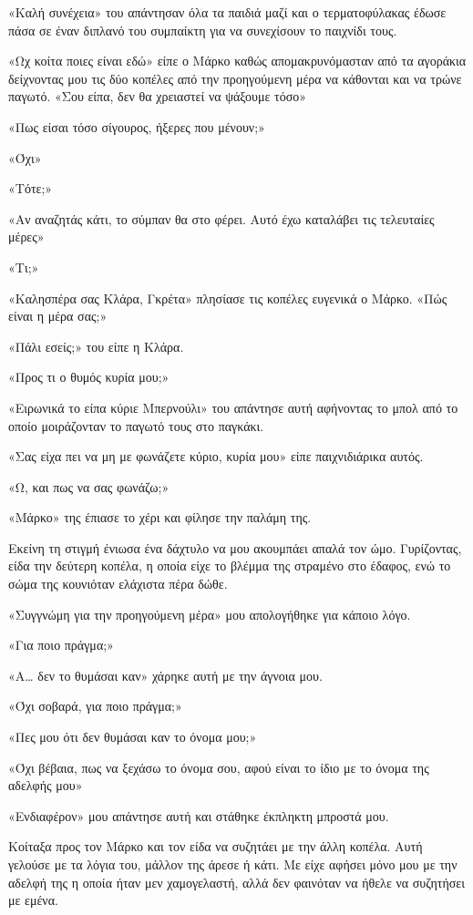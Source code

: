 \documentclass[12pt,twoside, openany]{book}
\begin{document}
«Καλή συνέχεια» του απάντησαν όλα τα παιδιά μαζί και ο τερματοφύλακας έδωσε πάσα σε έναν διπλανό του συμπαίκτη για να συνεχίσουν το παιχνίδι τους.

«Ωχ κοίτα ποιες είναι εδώ» είπε ο Μάρκο καθώς απομακρυνόμασταν από τα αγοράκια δείχνοντας μου τις δύο κοπέλες από την προηγούμενη μέρα να κάθονται και να τρώνε παγωτό. «Σου είπα, δεν θα χρειαστεί να ψάξουμε τόσο»

«Πως είσαι τόσο σίγουρος, ήξερες που μένουν;»

«Όχι»

«Τότε;»

«Αν αναζητάς κάτι, το σύμπαν θα στο φέρει. Αυτό έχω καταλάβει τις τελευταίες μέρες»

«Τι;»

«Καλησπέρα σας Κλάρα, Γκρέτα» πλησίασε τις κοπέλες ευγενικά ο Μάρκο. «Πώς είναι η μέρα σας;»

«Πάλι εσείς;» του είπε η Κλάρα.

«Προς τι ο θυμός κυρία μου;»

«Ειρωνικά το είπα κύριε Μπερνούλι» του απάντησε αυτή αφήνοντας το μπολ από το οποίο μοιράζονταν το παγωτό τους στο παγκάκι.

«Σας είχα πει να μη με φωνάζετε κύριο, κυρία μου» είπε παιχνιδιάρικα αυτός.

«Ω, και πως να σας φωνάζω;»

«Μάρκο» της έπιασε το χέρι και φίλησε την παλάμη της.

Εκείνη τη στιγμή ένιωσα ένα δάχτυλο να μου ακουμπάει απαλά τον ώμο. Γυρίζοντας, είδα την δεύτερη κοπέλα, η οποία είχε το βλέμμα της στραμένο στο έδαφος, ενώ το σώμα της κουνιόταν ελάχιστα πέρα δώθε. 

«Συγγνώμη για την προηγούμενη μέρα» μου απολογήθηκε για κάποιο λόγο.

«Για ποιο πράγμα;»

«Α… δεν το θυμάσαι καν» χάρηκε αυτή με την άγνοια μου.

«Όχι σοβαρά, για ποιο πράγμα;»

«Πες μου ότι δεν θυμάσαι καν το όνομα μου;» 

«Όχι βέβαια, πως να ξεχάσω το όνομα σου, αφού είναι το ίδιο με το όνομα της αδελφής μου»

«Ενδιαφέρον» μου απάντησε αυτή και στάθηκε έκπληκτη μπροστά μου.

Κοίταξα προς τον Μάρκο και τον είδα να συζητάει με την άλλη κοπέλα. Αυτή γελούσε με τα λόγια του, μάλλον της άρεσε ή κάτι. Με είχε αφήσει μόνο μου με την αδελφή της η οποία ήταν μεν χαμογελαστή, αλλά δεν φαινόταν να ήθελε να συζητήσει με εμένα.
\end{document}
